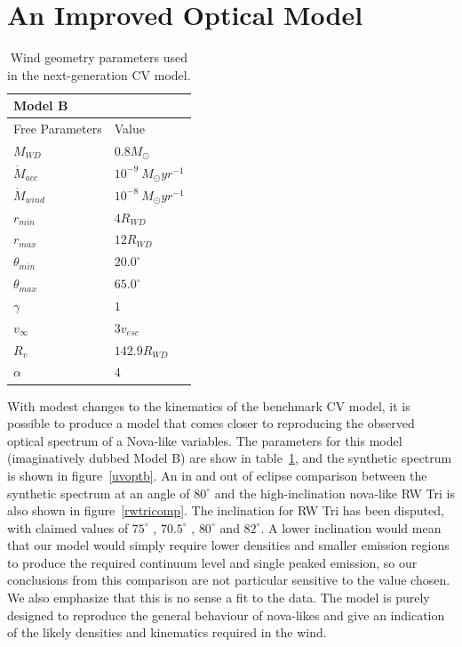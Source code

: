 \documentclass[preprint, a4paper, 11pt]{aastex}
\begin{document}
\section{An Improved Optical Model }

\begin{table}
\centering
\begin{tabular}{p{3cm}p{4cm}}
Model B \\
\hline Free Parameters 	&	 Value \\ 
\hline \hline 
$M_{WD}$ 	 &	 $0.8 M_{\odot}$ \\ 
$\dot{M}_{acc}$ 	 &	 $10^{-9}~M_{\odot}yr^{-1}$\\ 
$\dot{M}_{wind}$  &	$10^{-8}~M_{\odot}yr^{-1}$\\ 
$r_{min}$ 	&	 $4 R_{WD}$\\ 
$r_{max}$ 	&	 $12 R_{WD}$ \\ 
$\theta_{min}$ 	&	 $20.0^{\circ}$ \\ 
$\theta_{max}$ 	&	 $65.0^{\circ}$ \\ 
$\gamma$ 	&	 $1$ \\ 
$v_{\infty}$ 	&	 $3v_{esc}$ \\ 
$R_v$ 	        &	 $142.9 R_{WD}$ \\ 
$\alpha$ 	&	 $4$ \\
\end{tabular}
\centering
\caption{Wind geometry parameters used in the next-generation CV model.}
\label{modelb}
\end{table}

With modest changes to the kinematics of the benchmark CV model,
it is possible to produce a model
that comes closer to reproducing the observed optical spectrum
of a Nova-like variables. The parameters for this model (imaginatively dubbed Model B)
are show in table~\ref{modelb}, and the synthetic spectrum
is shown in figure~\ref{uvoptb}. An in and out of eclipse comparison 
between the synthetic spectrum
at an angle of $80^\circ$ and the high-inclination nova-like RW Tri 
is also shown in figure~\ref{rwtricomp}. The inclination
for RW Tri has been disputed, with claimed values of $75^\circ$ \citep{groot2004},
$70.5^\circ$ \citep{smak1995}, $80^\circ$ \citep{longmore1981} and 
$82^\circ$\citep{frankking1981}. A lower inclination
would mean that our model would simply require lower densities 
and smaller emission regions to produce the required continuum level
and single peaked emission, so our conclusions from this comparison are
not particular sensitive to the value chosen.
We also emphasize that this is no sense a fit to the data. The model
is purely designed to reproduce the general behaviour of nova-likes
and give an indication of the likely densities and kinematics 
required in the wind.
\end{document}
